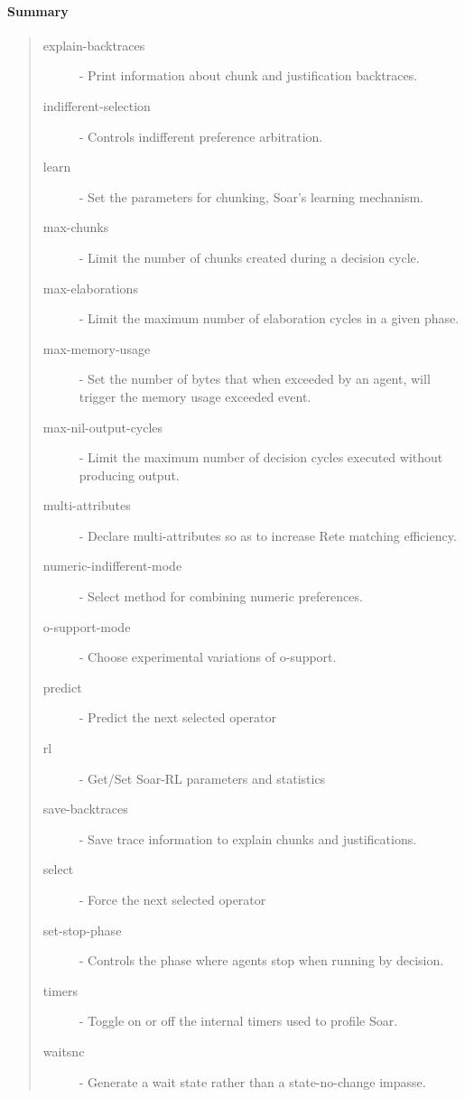 \paragraph{Summary}
\begin{quote}
\begin{description}
\item[explain-backtraces] - Print information about chunk and justification backtraces.
\item[indifferent-selection] -  Controls indifferent preference arbitration.
\item[learn] - Set the parameters for chunking, Soar's learning mechanism.
\item[max-chunks] - Limit the number of chunks created during a decision cycle.
\item[max-elaborations] - Limit the maximum number of elaboration cycles in a given phase.
\item[max-memory-usage] - Set the number of bytes that when exceeded by an agent, will trigger the memory usage exceeded event. 
\item[max-nil-output-cycles] - Limit the maximum number of decision cycles executed without producing output. 
\item[multi-attributes] - Declare multi-attributes so as to increase Rete matching efficiency.
\item[numeric-indifferent-mode] - Select method for combining numeric preferences.
\item[o-support-mode] - Choose experimental variations of o-support.
\item[predict] - Predict the next selected operator 
\item[rl] - Get/Set Soar-RL parameters and statistics 
\item[save-backtraces] - Save trace information to explain chunks and justifications.
\item[select] - Force the next selected operator 
\item[set-stop-phase] -  Controls the phase where agents stop when running by decision.
\item[timers] - Toggle on or off the internal timers used to profile Soar.
\item[waitsnc] - Generate a wait state rather than a state-no-change impasse.
\end{description}
\end{quote}



















